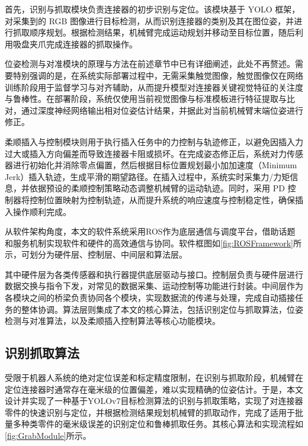 \documentclass{Diploma}
\begin{document}
%

首先，识别与抓取模块负责连接器的初步识别与定位。该模块基于 YOLO 框架，对采集到的 RGB 图像进行目标检测，从而识别连接器的类别及其在图位姿，并进行抓取顺序规划。根据检测结果，机械臂完成运动规划并移动至目标位置，随后利用吸盘夹爪完成连接器的抓取操作。

位姿检测与对准模块的原理与方法在前述章节中已有详细阐述，此处不再赘述。需要特别强调的是，在系统实际部署过程中，无需采集触觉图像，触觉图像仅在网络训练阶段用于监督学习与对齐辅助，从而提升模型对连接器关键视觉特征的关注度与鲁棒性。在部署阶段，系统仅使用当前视觉图像与标准模板进行特征提取与比对，通过深度神经网络输出相对位姿估计结果，并据此对当前机械臂末端位姿进行修正。

柔顺插入与控制模块则用于执行插入任务中的力控制与轨迹修正，以避免因插入力过大或插入方向偏差而导致连接器卡阻或损坏。在完成姿态修正后，系统对力传感器进行初始化并消除零点偏置，然后根据目标位置规划最小加加速度（Minimum Jerk）插入轨迹，生成平滑的期望路径。在插入过程中，系统实时采集力/力矩信息，并依据预设的柔顺控制策略动态调整机械臂的运动轨迹。同时，采用 PD 控制器将控制位置映射为控制轨迹，从而提升系统的响应速度与控制稳定性，确保插入操作顺利完成。

从软件架构角度，本文的软件系统采用ROS作为底层通信与调度平台，借助话题和服务机制实现软件和硬件的高效通信与协同。软件框图如\ref{fig:ROSFramework}所示，可划分为硬件层、控制层、中间层和算法层。

%

其中硬件层为各类传感器和执行器提供底层驱动与接口。控制层负责与硬件层进行数据交换与指令下发，对常见的数据采集、运动控制等功能进行封装。中间层作为各模块之间的桥梁负责协同各个模块，实现数据流的传递与处理，完成自动插接任务的整体协调。算法层则集成了本文的核心算法，包括识别定位与抓取算法，位姿检测与对准算法，以及柔顺插入控制算法等核心功能模块。
\subsection{识别抓取算法}
受限于机器人系统的绝对定位误差和标定精度限制，在识别与抓取阶段，机械臂在定位连接器时通常存在毫米级的位置偏差，难以实现精确的位姿估计。于是，本文设计并实现了一种基于YOLOv7目标检测算法的识别与抓取策略，实现了对连接器零件的快速识别与定位，并根据检测结果规划机械臂的抓取动作，完成了适用于批量多种类零件的毫米级误差的识别定位和鲁棒抓取任务。其核心算法和实现流程如\ref{fig:GrabModule}所示。
\end{document}
